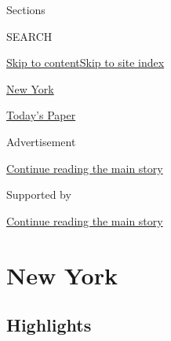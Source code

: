 Sections

SEARCH

\protect\hyperlink{site-content}{Skip to
content}\protect\hyperlink{site-index}{Skip to site index}

\href{https://www.nytimes3xbfgragh.onion/section/nyregion}{New York}

\href{https://myaccount.nytimes3xbfgragh.onion/auth/login?response_type=cookie\&client_id=vi}{}

\href{https://www.nytimes3xbfgragh.onion/section/todayspaper}{Today's
Paper}

Advertisement

\protect\hyperlink{after-top}{Continue reading the main story}

Supported by

\protect\hyperlink{after-sponsor}{Continue reading the main story}

\hypertarget{new-york}{%
\section{New York}\label{new-york}}

\hypertarget{highlights}{%
\subsection{Highlights}\label{highlights}}

